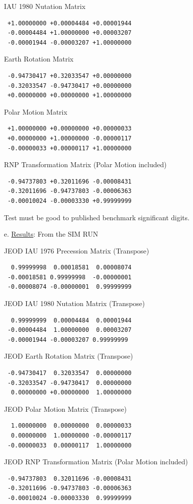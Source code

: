 IAU 1980 Nutation Matrix
\begin{verbatim}
 +1.00000000 +0.00004484 +0.00001944
 -0.00004484 +1.00000000 +0.00003207
 -0.00001944 -0.00003207 +1.00000000
\end{verbatim}

Earth Rotation Matrix
\begin{verbatim}
 -0.94730417 +0.32033547 +0.00000000
 -0.32033547 -0.94730417 +0.00000000
 +0.00000000 +0.00000000 +1.00000000
\end{verbatim}

Polar Motion Matrix
\begin{verbatim}
 +1.00000000 +0.00000000 +0.00000033
 +0.00000000 +1.00000000 -0.00000117
 -0.00000033 +0.00000117 +1.00000000
\end{verbatim}

RNP Transformation Matrix (Polar Motion included)
\begin{verbatim}
 -0.94737803 +0.32011696 -0.00008431
 -0.32011696 -0.94737803 -0.00006363
 -0.00010024 -0.00003330 +0.99999999
\end{verbatim}

Test must be good to published benchmark significant digits.

e. \underline{Results}:
From the SIM RUN

JEOD IAU 1976 Precession Matrix (Transpose)
\begin{verbatim}
  0.99999998  0.00018581  0.00008074
 -0.00018581 0.99999998  -0.00000001
 -0.00008074 -0.00000001  0.99999999
\end{verbatim}

JEOD IAU 1980 Nutation Matrix (Transpose)
\begin{verbatim}
  0.99999999  0.00004484  0.00001944
 -0.00004484  1.00000000  0.00003207
 -0.00001944 -0.00003207 0.99999999
\end{verbatim}

JEOD Earth Rotation Matrix (Transpose)
\begin{verbatim}
 -0.94730417  0.32033547  0.00000000
 -0.32033547 -0.94730417  0.00000000
  0.00000000 +0.00000000  1.00000000
\end{verbatim}

JEOD Polar Motion Matrix (Transpose)
\begin{verbatim}
  1.00000000  0.00000000  0.00000033
  0.00000000  1.00000000 -0.00000117
 -0.00000033  0.00000117  1.00000000
\end{verbatim}


JEOD RNP Transformation Matrix (Polar Motion included)
\begin{verbatim}
 -0.94737803  0.32011696 -0.00008431
 -0.32011696 -0.94737803 -0.00006363
 -0.00010024 -0.00003330  0.99999999
\end{verbatim}

